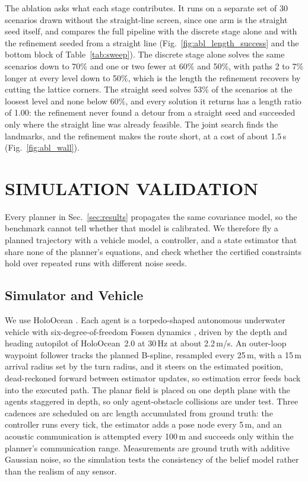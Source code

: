 \documentclass[letterpaper, 10 pt, conference]{ieeeconf}
\theoremstyle{remark}
\begin{document}
The ablation asks what each stage contributes. It runs on a separate set of
30 scenarios drawn without the straight-line screen, since one arm is the
straight seed itself, and compares the full pipeline with the discrete stage
alone and with the refinement seeded from a straight line
(Fig.~\ref{fig:abl_length_success} and the bottom block of
Table~\ref{tab:sweep}). The discrete stage alone solves the same scenarios
down to 70\% and one or two fewer at 60\% and 50\%, with paths 2 to 7\%
longer at every level down to 50\%, which is the length the refinement
recovers by cutting the lattice corners. The straight seed solves 53\% of
the scenarios at the loosest level and none below 60\%, and every solution
it returns has a length ratio of 1.00: the refinement never found a detour
from a straight seed and succeeded only where the straight line was already
feasible. The joint search finds the landmarks, and the
refinement makes the route short, at a cost of about 1.5\,s
(Fig.~\ref{fig:abl_wall}).

\section{SIMULATION VALIDATION}
\label{sec:sim}
Every planner in Sec.~\ref{sec:results} propagates the same covariance
model, so the benchmark cannot tell whether that model is calibrated. We
therefore fly a planned trajectory with a vehicle model, a controller, and a
state estimator that share none of the planner's equations, and check
whether the certified constraints hold over repeated runs with different
noise seeds.

\subsection{Simulator and Vehicle}

We use HoloOcean \cite{potokar2022holoocean,potokar2024holoocean}. Each
agent is a torpedo-shaped autonomous underwater vehicle with
six-degree-of-freedom Fossen dynamics \cite{fossen2021handbook}, driven by
the depth and heading autopilot of HoloOcean~2.0 \cite{romrell2025holoocean2}
at 30\,Hz at about 2.2\,m/s. An outer-loop waypoint follower
tracks the planned B-spline, resampled every 25\,m, with a 15\,m arrival
radius set by the turn radius, and it steers on the estimated position,
dead-reckoned forward between estimator updates, so estimation error feeds
back into the executed path. The planar field is placed on one depth plane
with the agents staggered in depth, so only agent-obstacle collisions are
under test. Three cadences are scheduled on arc length accumulated from
ground truth: the controller runs every tick, the estimator adds a pose node every 5\,m, and
an acoustic communication is attempted every 100\,m and succeeds only within
the planner's communication range. Measurements are ground truth with
additive Gaussian noise, so the simulation tests the consistency of the
belief model rather than the realism of any sensor.
\end{document}
